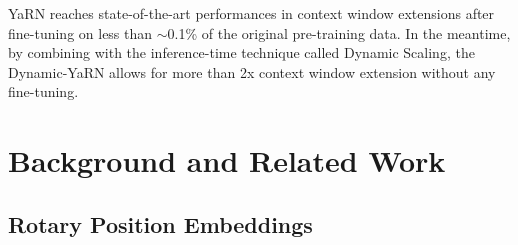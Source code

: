 \documentclass{article} %
\begin{document}
YaRN reaches state-of-the-art performances in context window extensions after fine-tuning on less than $\sim$0.1\% of the original pre-training data. In the meantime, by combining with the inference-time technique called Dynamic Scaling, the Dynamic-YaRN allows for more than 2x context window extension without any fine-tuning.


\section{Background and Related Work}

\subsection{Rotary Position Embeddings}\label{sec:rope}
\end{document}
